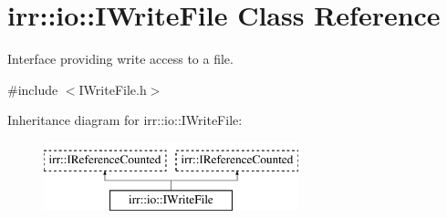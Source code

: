 \hypertarget{classirr_1_1io_1_1IWriteFile}{}\section{irr\+:\+:io\+:\+:I\+Write\+File Class Reference}
\label{classirr_1_1io_1_1IWriteFile}


Interface providing write access to a file.  




{\ttfamily \#include $<$I\+Write\+File.\+h$>$}

Inheritance diagram for irr\+:\+:io\+:\+:I\+Write\+File\+:\begin{figure}[H]
\begin{center}
\leavevmode
\includegraphics[height=2.000000cm]{classirr_1_1io_1_1IWriteFile}
\end{center}
\end{figure}
